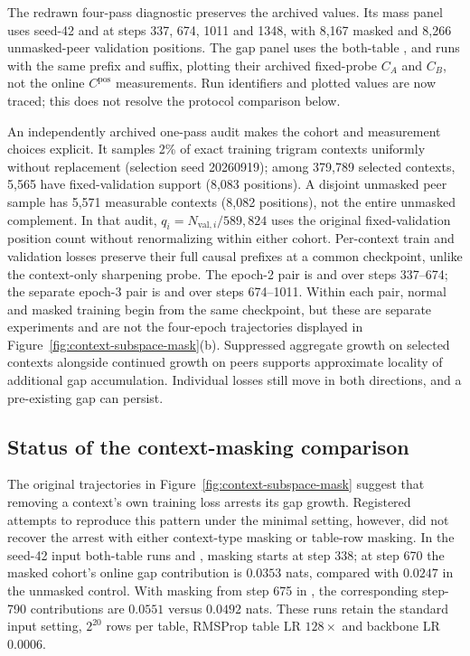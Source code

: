 The redrawn four-pass diagnostic preserves the archived values. Its mass panel uses seed-42  and  at steps 337, 674, 1011 and 1348, with 8,167 masked and 8,266 unmasked-peer validation positions. The gap panel uses the both-table ,  and  runs with the same prefix and  suffix, plotting their archived fixed-probe $C_A$ and $C_B$, not the online $C^{\mathrm{pos}}$ measurements. Run identifiers and plotted values are now traced; this does not resolve the protocol comparison below.

An independently archived one-pass audit makes the cohort and measurement choices explicit. It samples 2\% of exact training trigram contexts uniformly without replacement (selection seed 20260919); among 379{,}789 selected contexts, 5{,}565 have fixed-validation support (8{,}083 positions). A disjoint unmasked peer sample has 5{,}571 measurable contexts (8{,}082 positions), not the entire unmasked complement. In that audit, $q_i=N_{\mathrm{val},i}/589{,}824$ uses the original fixed-validation position count without renormalizing within either cohort. Per-context train and validation losses preserve their full causal prefixes at a common checkpoint, unlike the context-only sharpening probe. The epoch-2 pair is  and  over steps 337--674; the separate epoch-3 pair is  and  over steps 674--1011. Within each pair, normal and masked training begin from the same checkpoint, but these are separate experiments and are not the four-epoch trajectories displayed in Figure~\ref{fig:context-subspace-mask}(b). Suppressed aggregate growth on selected contexts alongside continued growth on peers supports approximate locality of additional gap accumulation. Individual losses still move in both directions, and a pre-existing gap can persist.

\subsection{Status of the context-masking comparison}
\label{app:mask-reconciliation}

The original trajectories in Figure~\ref{fig:context-subspace-mask} suggest that removing a context's own training loss arrests its gap growth. Registered attempts to reproduce this pattern under the minimal setting, however, did not recover the arrest with either context-type masking or table-row masking. In the seed-42 input both-table runs  and , masking starts at step 338; at step 670 the masked cohort's online gap contribution is $0.0353$ nats, compared with $0.0247$ in the unmasked control. With masking from step 675 in , the corresponding step-790 contributions are $0.0551$ versus $0.0492$ nats. These runs retain the standard input setting, $2^{20}$ rows per table, RMSProp table LR $128\times$ and backbone LR $0.0006$.

